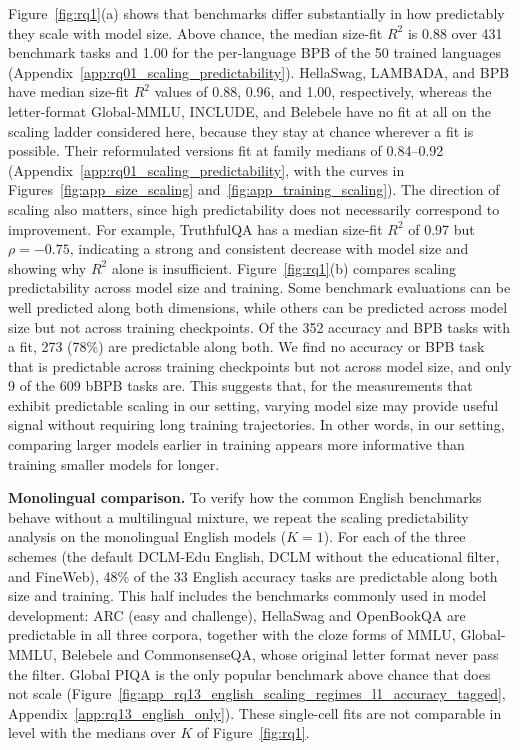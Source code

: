 Figure~\ref{fig:rq1}(a) shows that benchmarks differ substantially in how predictably they scale with model size. Above chance, the median size-fit $R^2$ is 0.88 over 431 benchmark tasks and 1.00 for the per-language BPB of the 50 trained languages (Appendix~\ref{app:rq01_scaling_predictability}). HellaSwag, LAMBADA, and BPB have median size-fit $R^2$ values of 0.88, 0.96, and 1.00, respectively, whereas the letter-format Global-MMLU, INCLUDE, and Belebele have no fit at all on the scaling ladder considered here, because they stay at chance wherever a fit is possible. Their reformulated versions fit at family medians of 0.84--0.92 (Appendix~\ref{app:rq01_scaling_predictability}, with the curves in Figures~\ref{fig:app_size_scaling} and~\ref{fig:app_training_scaling}). The direction of scaling also matters, since high predictability does not necessarily correspond to improvement. For example, TruthfulQA has a median size-fit $R^2$ of 0.97 but $\rho=-0.75$, indicating a strong and consistent decrease with model size and showing why $R^2$ alone is insufficient.
Figure~\ref{fig:rq1}(b) compares scaling predictability across model size and training. Some benchmark evaluations can be well predicted along both dimensions, while others can be predicted across model size but not across training checkpoints. Of the 352 accuracy and BPB tasks with a fit, 273 (78\%) are predictable along both. We find no accuracy or BPB task that is predictable across training checkpoints but not across model size, and only 9 of the 609 bBPB tasks are.
This suggests that, for the measurements that exhibit predictable scaling in our setting, varying model size may provide useful signal without requiring long training trajectories.
In other words, in our setting, comparing larger models earlier in training appears more informative than training smaller models for longer.

\textbf{Monolingual comparison.} To verify how the common English benchmarks behave without a multilingual mixture, we repeat the scaling predictability analysis on the monolingual English models ($K=1$). For each of the three schemes (the default DCLM-Edu English, DCLM without the educational filter, and FineWeb), 48\% of the 33 English accuracy tasks are predictable along both size and training.
This half includes the benchmarks commonly used in model development: ARC (easy and challenge), HellaSwag and OpenBookQA are predictable in all three corpora, together with the cloze forms of MMLU, Global-MMLU, Belebele and CommonsenseQA, whose original letter format never pass the filter. Global PIQA is the only popular benchmark above chance that does not scale (Figure~\ref{fig:app_rq13_english_scaling_regimes_l1_accuracy_tagged}, Appendix~\ref{app:rq13_english_only}).
These single-cell fits are not comparable in level with the medians over $K$ of Figure~\ref{fig:rq1}.

